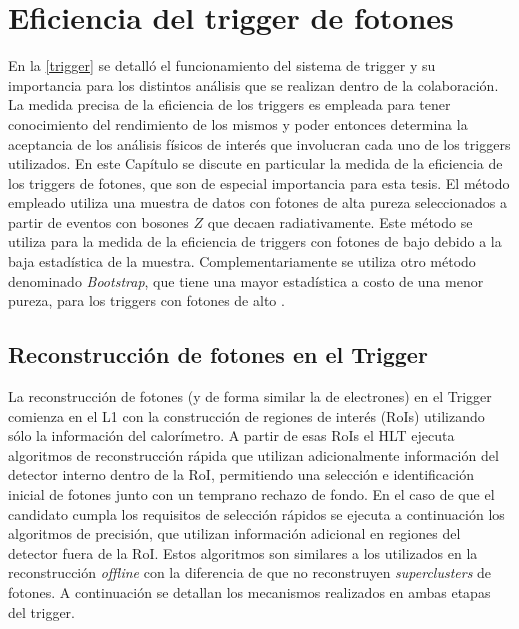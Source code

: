 \chapter{Eficiencia del trigger de fotones}



En la \autoref{trigger} se detalló el funcionamiento del sistema de trigger y su importancia para los distintos análisis que se realizan dentro de la colaboración. La medida precisa de la eficiencia de los triggers es empleada para tener conocimiento del rendimiento de los mismos y poder entonces determina la aceptancia de los análisis físicos de interés que involucran cada uno de los triggers utilizados. 
En este Capítulo se discute en particular la medida de la eficiencia de los triggers de fotones, que son de especial importancia para esta tesis. El método empleado utiliza una muestra de datos con fotones de alta pureza seleccionados a partir de eventos con bosones $Z$ que decaen radiativamente. Este método se utiliza para la medida de la eficiencia de triggers con fotones de bajo \pt debido a la baja estadística de la muestra. Complementariamente se utiliza otro método denominado \textit{Bootstrap}, que tiene una mayor estadística a costo de una menor pureza, para los triggers con fotones de alto \pt. 


\section{Reconstrucción de fotones en el Trigger}

La reconstrucción de fotones \cite{TRIG-2018-05} (y de forma similar la de electrones) en el Trigger comienza en el L1 con la construcción de regiones de interés (RoIs) utilizando sólo la información del calorímetro. A partir de esas RoIs el HLT ejecuta algoritmos de reconstrucción rápida que utilizan adicionalmente información del detector interno dentro de la RoI, permitiendo una selección e identificación inicial de fotones junto con un temprano rechazo de fondo. En el caso de que el candidato cumpla los requisitos de selección rápidos se ejecuta a continuación los algoritmos de precisión, que utilizan información adicional en regiones del detector fuera de la RoI. Estos algoritmos son similares a los utilizados en la reconstrucción \textit{offline} con la diferencia de que no reconstruyen \textit{superclusters} de fotones. 
A continuación se detallan los mecanismos realizados en ambas etapas del trigger.

